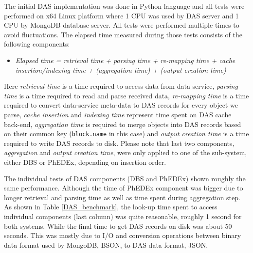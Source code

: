 \documentclass[1p,times]{elsarticle}
\begin{document}
The initial DAS implementation was done in Python language \cite{Python}
and all tests were performed on x64 Linux platform where
1 CPU was used by DAS server and 1 CPU by MongoDB database server. 
All tests were performed multiple times to avoid fluctuations. 
The elapsed time measured during those tests consists of the 
following components:
\begin{itemize}
\item[]
{\it
Elapsed time = retrieval time + parsing time + re-mapping time 
        + cache insertion/indexing time 
        + (aggregation time) + (output creation time)
}
\end{itemize}
Here {\it retrieval time} is a time required to access data from data-service,
{\it parsing time} is a time required to read and parse received data, {\it re-mapping time}
is a time required to convert data-service meta-data to DAS records for every object
we parse, {\it cache insertion} and {\it indexing time} represent time spent on DAS 
cache back-end, {\it aggregation time} is required to merge objects into DAS records based
on their common key (\verb+block.name+ in this case) and {\it output creation time}
is a time required to write DAS records to disk. Please note that last two
components, {\it aggregation} and {\it output creation time}, were only applied to
one of the sub-system, either DBS or PhEDEx, depending on insertion order.

%

The individual tests of DAS components (DBS and PhEDEx) shown roughly 
the same performance. Although the time of PhEDEx component was bigger 
due to longer retrieval and parsing time as well as time spent
during aggregation step.
As shown in Table \ref{DAS_benchmark},
the look-up time spent to access individual components (last column) was quite
reasonable, roughly 1 second for both systems. While the final time to
get DAS records on disk was about 50 seconds. This was mostly due to I/O and
conversion operations between binary data format used by MongoDB, BSON, to DAS
data format, JSON.
\end{document}
